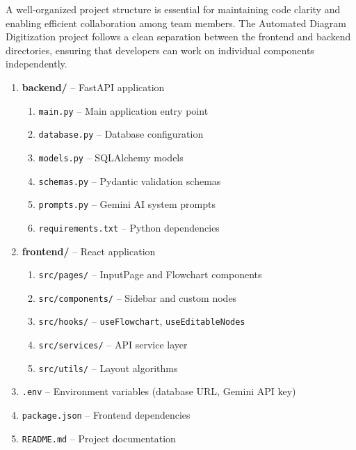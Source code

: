 A well-organized project structure is essential for maintaining 
code clarity and enabling efficient collaboration among team 
members. The Automated Diagram Digitization project follows a 
clean separation between the frontend and backend directories, 
ensuring that developers can work on individual components 
independently.
\begin{enumerate}

    \item \textbf{backend/} -- FastAPI application
    \begin{enumerate}
        \item \texttt{main.py} -- Main application entry point
        \item \texttt{database.py} -- Database configuration
        \item \texttt{models.py} -- SQLAlchemy models
        \item \texttt{schemas.py} -- Pydantic validation schemas
        \item \texttt{prompts.py} -- Gemini AI system prompts
        \item \texttt{requirements.txt} -- Python dependencies
    \end{enumerate}

    \item \textbf{frontend/} -- React application
    \begin{enumerate}
        \item \texttt{src/pages/} -- InputPage and Flowchart 
              components
        \item \texttt{src/components/} -- Sidebar and custom 
              nodes
        \item \texttt{src/hooks/} -- \texttt{useFlowchart}, 
              \texttt{useEditableNodes}
        \item \texttt{src/services/} -- API service layer
        \item \texttt{src/utils/} -- Layout algorithms
    \end{enumerate}

    \item \texttt{.env} -- Environment variables (database URL, 
          Gemini API key)
    \item \texttt{package.json} -- Frontend dependencies
    \item \texttt{README.md} -- Project documentation

\end{enumerate}

